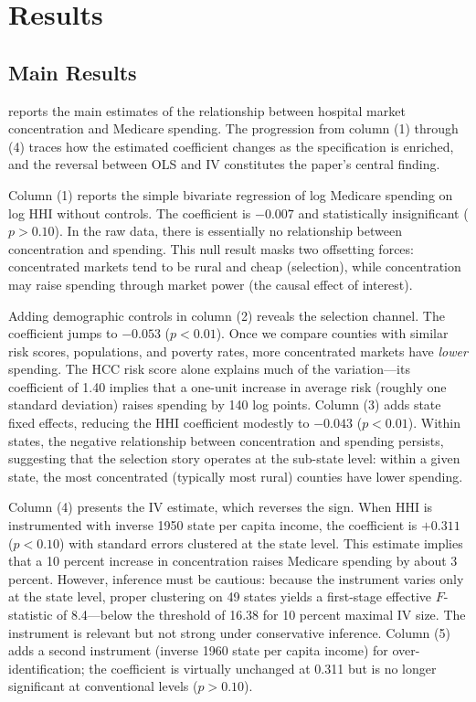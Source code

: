 \documentclass[12pt]{article}
\begin{document}
\section{Results}

\subsection{Main Results}

 reports the main estimates of the relationship between hospital market concentration and Medicare spending. The progression from column (1) through (4) traces how the estimated coefficient changes as the specification is enriched, and the reversal between OLS and IV constitutes the paper's central finding.

Column (1) reports the simple bivariate regression of log Medicare spending on log HHI without controls. The coefficient is $-0.007$ and statistically insignificant ($p > 0.10$). In the raw data, there is essentially no relationship between concentration and spending. This null result masks two offsetting forces: concentrated markets tend to be rural and cheap (selection), while concentration may raise spending through market power (the causal effect of interest).

Adding demographic controls in column (2) reveals the selection channel. The coefficient jumps to $-0.053$ ($p < 0.01$). Once we compare counties with similar risk scores, populations, and poverty rates, more concentrated markets have \emph{lower} spending. The HCC risk score alone explains much of the variation---its coefficient of 1.40 implies that a one-unit increase in average risk (roughly one standard deviation) raises spending by 140 log points. Column (3) adds state fixed effects, reducing the HHI coefficient modestly to $-0.043$ ($p < 0.01$). Within states, the negative relationship between concentration and spending persists, suggesting that the selection story operates at the sub-state level: within a given state, the most concentrated (typically most rural) counties have lower spending.

Column (4) presents the IV estimate, which reverses the sign. When HHI is instrumented with inverse 1950 state per capita income, the coefficient is $+0.311$ ($p < 0.10$) with standard errors clustered at the state level. This estimate implies that a 10 percent increase in concentration raises Medicare spending by about 3 percent. However, inference must be cautious: because the instrument varies only at the state level, proper clustering on 49 states yields a first-stage effective $F$-statistic of 8.4---below the \citet{stock2005testing} threshold of 16.38 for 10 percent maximal IV size. The instrument is relevant but not strong under conservative inference. Column (5) adds a second instrument (inverse 1960 state per capita income) for over-identification; the coefficient is virtually unchanged at 0.311 but is no longer significant at conventional levels ($p > 0.10$).
\end{document}
